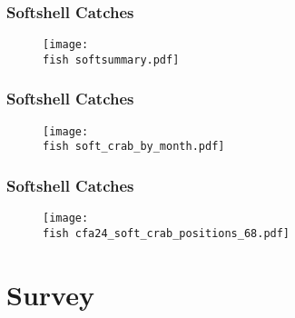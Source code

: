 \documentclass{beamer}
\begin{document}
	
	
	
	
	\begin{frame}
		\frametitle{Softshell Catches}
		\begin{figure}
			
			\vspace*{-.5cm}
			\centerline{\texttt{[image: \\fish softsummary.pdf]}}
			
		\end{figure}
	\end{frame}
	
	
	
	\begin{frame}
		\frametitle{Softshell Catches}
		\begin{figure}
			
			\vspace*{-.5cm}
			\centerline{\texttt{[image: \\fish soft\_crab\_by\_month.pdf]}}
			
		\end{figure}
	\end{frame}
	
	\begin{frame}
		\frametitle{Softshell Catches}
		\begin{figure}
			
			\vspace*{-.5cm}
			\centerline{\texttt{[image: \\fish cfa24\_soft\_crab\_positions\_68.pdf]}}
			
		\end{figure}
	\end{frame}
	
	\section{Survey}
	
\end{document}
